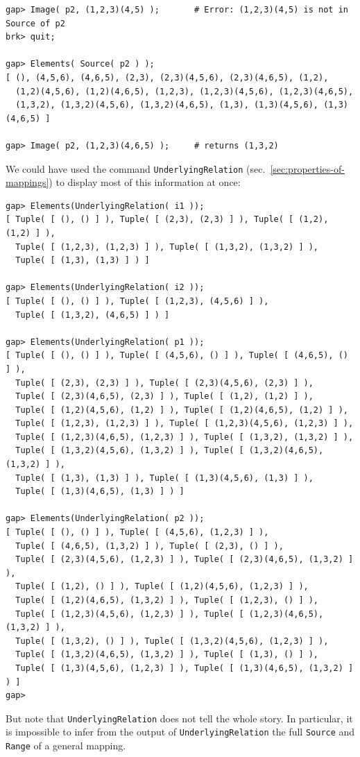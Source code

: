 {\begin{verbatim}
gap> Image( p2, (1,2,3)(4,5) );       # Error: (1,2,3)(4,5) is not in Source of p2
brk> quit;                           

gap> Elements( Source( p2 ) );
[ (), (4,5,6), (4,6,5), (2,3), (2,3)(4,5,6), (2,3)(4,6,5), (1,2), 
  (1,2)(4,5,6), (1,2)(4,6,5), (1,2,3), (1,2,3)(4,5,6), (1,2,3)(4,6,5), 
  (1,3,2), (1,3,2)(4,5,6), (1,3,2)(4,6,5), (1,3), (1,3)(4,5,6), (1,3)(4,6,5) ]

gap> Image( p2, (1,2,3)(4,6,5) );     # returns (1,3,2)

\end{verbatim}}
\noindent We could have used the command {\tt UnderlyingRelation}
(sec.~\ref{sec:properties-of-mappings}) to display most of this information
at once: 
{\codesize
\begin{verbatim}
gap> Elements(UnderlyingRelation( i1 ));
[ Tuple( [ (), () ] ), Tuple( [ (2,3), (2,3) ] ), Tuple( [ (1,2), (1,2) ] ), 
  Tuple( [ (1,2,3), (1,2,3) ] ), Tuple( [ (1,3,2), (1,3,2) ] ), 
  Tuple( [ (1,3), (1,3) ] ) ]

gap> Elements(UnderlyingRelation( i2 ));
[ Tuple( [ (), () ] ), Tuple( [ (1,2,3), (4,5,6) ] ), 
  Tuple( [ (1,3,2), (4,6,5) ] ) ]

gap> Elements(UnderlyingRelation( p1 ));
[ Tuple( [ (), () ] ), Tuple( [ (4,5,6), () ] ), Tuple( [ (4,6,5), () ] ), 
  Tuple( [ (2,3), (2,3) ] ), Tuple( [ (2,3)(4,5,6), (2,3) ] ), 
  Tuple( [ (2,3)(4,6,5), (2,3) ] ), Tuple( [ (1,2), (1,2) ] ), 
  Tuple( [ (1,2)(4,5,6), (1,2) ] ), Tuple( [ (1,2)(4,6,5), (1,2) ] ), 
  Tuple( [ (1,2,3), (1,2,3) ] ), Tuple( [ (1,2,3)(4,5,6), (1,2,3) ] ), 
  Tuple( [ (1,2,3)(4,6,5), (1,2,3) ] ), Tuple( [ (1,3,2), (1,3,2) ] ), 
  Tuple( [ (1,3,2)(4,5,6), (1,3,2) ] ), Tuple( [ (1,3,2)(4,6,5), (1,3,2) ] ), 
  Tuple( [ (1,3), (1,3) ] ), Tuple( [ (1,3)(4,5,6), (1,3) ] ), 
  Tuple( [ (1,3)(4,6,5), (1,3) ] ) ]

gap> Elements(UnderlyingRelation( p2 ));
[ Tuple( [ (), () ] ), Tuple( [ (4,5,6), (1,2,3) ] ), 
  Tuple( [ (4,6,5), (1,3,2) ] ), Tuple( [ (2,3), () ] ), 
  Tuple( [ (2,3)(4,5,6), (1,2,3) ] ), Tuple( [ (2,3)(4,6,5), (1,3,2) ] ), 
  Tuple( [ (1,2), () ] ), Tuple( [ (1,2)(4,5,6), (1,2,3) ] ), 
  Tuple( [ (1,2)(4,6,5), (1,3,2) ] ), Tuple( [ (1,2,3), () ] ), 
  Tuple( [ (1,2,3)(4,5,6), (1,2,3) ] ), Tuple( [ (1,2,3)(4,6,5), (1,3,2) ] ), 
  Tuple( [ (1,3,2), () ] ), Tuple( [ (1,3,2)(4,5,6), (1,2,3) ] ), 
  Tuple( [ (1,3,2)(4,6,5), (1,3,2) ] ), Tuple( [ (1,3), () ] ), 
  Tuple( [ (1,3)(4,5,6), (1,2,3) ] ), Tuple( [ (1,3)(4,6,5), (1,3,2) ] ) ]
gap> 
\end{verbatim}}
But note that {\tt UnderlyingRelation} does not tell the whole story.  In particular,
it is impossible to infer from the output of {\tt UnderlyingRelation} the full 
{\tt Source} and {\tt Range} of a general mapping.
\\

